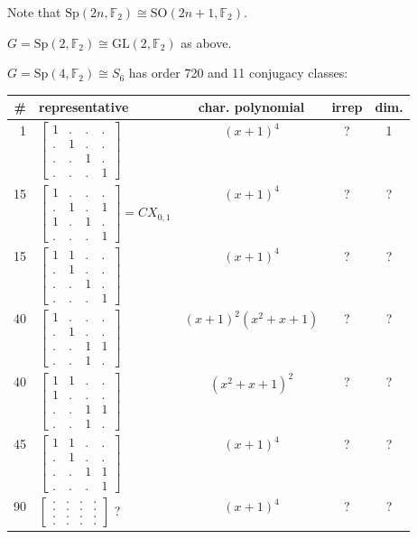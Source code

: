 \documentclass[11pt,oneside]{article}
\newcommand{\GL}{\mathrm{GL}}
\newcommand{\SO}{\mathrm{SO}}
\newcommand{\Sp}{\mathrm{Sp}}
\newcommand{\Field}{\mathbb{F}}
\begin{document}
Note that $\Sp(2n,\Field_2) \cong \SO(2n+1,\Field_2)$.

$G=\Sp(2,\Field_2)\cong \GL(2,\Field_2)$ as above.

$G=\Sp(4,\Field_2)\cong S_6$ has order 720 and 11 conjugacy classes:
\begin{center}
\begin{tabular}{r|l|c|c|c}
\# & representative & char. polynomial & irrep & dim. \\
\hline
1  & $\begin{bmatrix}1&.&.&.\\.&1&.&.\\.&.&1&.\\.&.&.&1\end{bmatrix}$  & $(x+1)^4$  & ? & 1  \\
15  & $\begin{bmatrix}1&.&.&.\\.&1&.&1\\1&.&1&.\\.&.&.&1\end{bmatrix}=CX_{0,1}$
    & $(x+1)^4$  & ? & ?  \\
15  & $\begin{bmatrix}1&1&.&.\\.&1&.&.\\.&.&1&.\\.&.&.&1\end{bmatrix}$  & $(x+1)^4$  & ? & ?  \\
40  &  $\begin{bmatrix}1&.&.&.\\.&1&.&.\\.&.&1&1\\.&.&1&.\end{bmatrix}$   & $(x+1)^2(x^2+x+1)$  & ? & ?  \\
40  & $\begin{bmatrix}1&1&.&.\\1&.&.&.\\.&.&1&1\\.&.&1&.\end{bmatrix}$    & $(x^2+x+1)^2$  & ? & ?  \\
45  & $\begin{bmatrix}1&1&.&.\\.&1&.&.\\.&.&1&1\\.&.&.&1\end{bmatrix}$  & $(x+1)^4$  & ? & ?  \\
90  &  $\begin{bmatrix}.&.&.&.\\.&.&.&.\\.&.&.&.\\.&.&.&.\end{bmatrix}$ ?  & $(x+1)^4$  & ? & ?  \\

\end{tabular}
\end{center}
\end{document}
